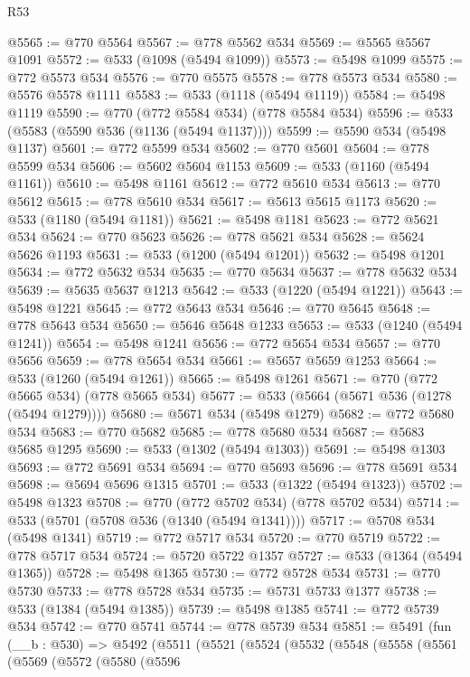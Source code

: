 \begin{lexlean}{R53}
\begin{coremodule}
@5565 := @770 @5564
@5567 := @778 @5562 @534
@5569 := @5565 @5567 @1091
@5572 := @533 (@1098 (@5494 @1099))
@5573 := @5498 @1099
@5575 := @772 @5573 @534
@5576 := @770 @5575
@5578 := @778 @5573 @534
@5580 := @5576 @5578 @1111
@5583 := @533 (@1118 (@5494 @1119))
@5584 := @5498 @1119
@5590 := @770 (@772 @5584 @534) (@778 @5584 @534)
@5596 := @533 (@5583 (@5590 @536 (@1136 (@5494 @1137))))
@5599 := @5590 @534 (@5498 @1137)
@5601 := @772 @5599 @534
@5602 := @770 @5601
@5604 := @778 @5599 @534
@5606 := @5602 @5604 @1153
@5609 := @533 (@1160 (@5494 @1161))
@5610 := @5498 @1161
@5612 := @772 @5610 @534
@5613 := @770 @5612
@5615 := @778 @5610 @534
@5617 := @5613 @5615 @1173
@5620 := @533 (@1180 (@5494 @1181))
@5621 := @5498 @1181
@5623 := @772 @5621 @534
@5624 := @770 @5623
@5626 := @778 @5621 @534
@5628 := @5624 @5626 @1193
@5631 := @533 (@1200 (@5494 @1201))
@5632 := @5498 @1201
@5634 := @772 @5632 @534
@5635 := @770 @5634
@5637 := @778 @5632 @534
@5639 := @5635 @5637 @1213
@5642 := @533 (@1220 (@5494 @1221))
@5643 := @5498 @1221
@5645 := @772 @5643 @534
@5646 := @770 @5645
@5648 := @778 @5643 @534
@5650 := @5646 @5648 @1233
@5653 := @533 (@1240 (@5494 @1241))
@5654 := @5498 @1241
@5656 := @772 @5654 @534
@5657 := @770 @5656
@5659 := @778 @5654 @534
@5661 := @5657 @5659 @1253
@5664 := @533 (@1260 (@5494 @1261))
@5665 := @5498 @1261
@5671 := @770 (@772 @5665 @534) (@778 @5665 @534)
@5677 := @533 (@5664 (@5671 @536 (@1278 (@5494 @1279))))
@5680 := @5671 @534 (@5498 @1279)
@5682 := @772 @5680 @534
@5683 := @770 @5682
@5685 := @778 @5680 @534
@5687 := @5683 @5685 @1295
@5690 := @533 (@1302 (@5494 @1303))
@5691 := @5498 @1303
@5693 := @772 @5691 @534
@5694 := @770 @5693
@5696 := @778 @5691 @534
@5698 := @5694 @5696 @1315
@5701 := @533 (@1322 (@5494 @1323))
@5702 := @5498 @1323
@5708 := @770 (@772 @5702 @534) (@778 @5702 @534)
@5714 := @533 (@5701 (@5708 @536 (@1340 (@5494 @1341))))
@5717 := @5708 @534 (@5498 @1341)
@5719 := @772 @5717 @534
@5720 := @770 @5719
@5722 := @778 @5717 @534
@5724 := @5720 @5722 @1357
@5727 := @533 (@1364 (@5494 @1365))
@5728 := @5498 @1365
@5730 := @772 @5728 @534
@5731 := @770 @5730
@5733 := @778 @5728 @534
@5735 := @5731 @5733 @1377
@5738 := @533 (@1384 (@5494 @1385))
@5739 := @5498 @1385
@5741 := @772 @5739 @534
@5742 := @770 @5741
@5744 := @778 @5739 @534
@5851 := @5491
    (fun (__b : @530) =>
    @5492
      (@5511
        (@5521
          (@5524
            (@5532
              (@5548
                (@5558
                  (@5561
                    (@5569
                      (@5572
                        (@5580
                          (@5596

\end{coremodule}
\end{lexlean}
